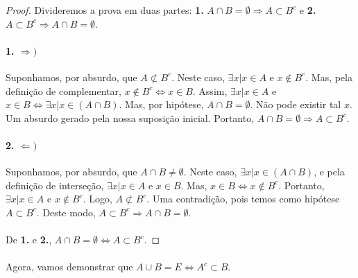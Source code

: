 \documentclass[9pt,twocolumn,a4paper]{article}
\begin{document}
    \begin{proof}
    Divideremos a prova em duas partes: \textbf{1.} $A \cap B = \emptyset \Rightarrow A \subset B^c$ e \textbf{2.} $ A\subset B^c \Rightarrow A \cap B = \emptyset$.

    \paragraph{1. $\Rightarrow)$}
    Suponhamos, por absurdo, que $A \not\subset B^c$. Neste caso, $\exists x | x \in A$ e $x \not\in B^c$. Mas, pela definição de complementar, $x \not\in B^c \Leftrightarrow x \in B$. Assim, $\exists x | x \in A$ e $x \in B \Leftrightarrow \exists x | x \in (A \cap B)$. Mas, por hipótese, $A \cap B = \emptyset$. Não pode existir tal $x$. Um absurdo gerado pela nossa suposição inicial. Portanto, $A \cap B = \emptyset \Rightarrow A \subset B^c$.


    \paragraph{2. $\Leftarrow)$}
    Suponhamos, por absurdo, que $A \cap B \not= \emptyset.$ Neste caso, $\exists x | x \in (A \cap B)$, e pela definição de interseção, $\exists x| x \in A $ e $x \in B$. Mas, $x \in B \Leftrightarrow x \not\in B^c$. Portanto, $\exists x | x \in A $ e $x \not\in B^c$. Logo, $A \not\subset B^c$. Uma contradição, pois temos como hipótese $A \subset B^c$. Deste modo, $A \subset B^c \Rightarrow A \cap B = \emptyset$.

    \paragraph{}
    De \textbf{1.} e \textbf{2.}, $A \cap B = \emptyset \Leftrightarrow A \subset B^c$.
    \end{proof}
    
    \paragraph{}
    Agora, vamos demonstrar que $A \cup B = E \Leftrightarrow A^c \subset B$.
\end{document}
